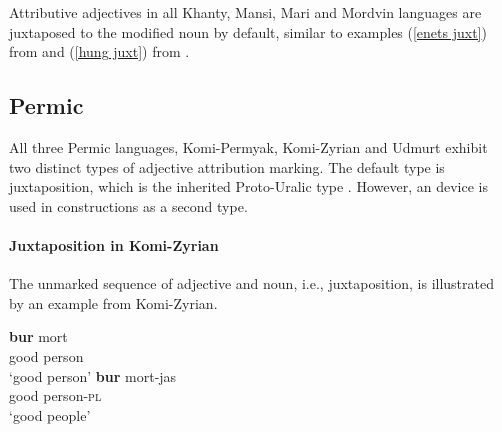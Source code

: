 Attributive adjectives in all Khanty, Mansi, Mari and Mordvin languages are juxtaposed to the modified noun by default, similar to examples (\ref{enets juxt}) from  and (\ref{hung juxt}) from .

\subsection{Permic}
All three Permic languages, Komi-Permyak, Komi-Zyrian and Udmurt exhibit two distinct types of adjective attribution marking. The default type is juxtaposition, which is the inherited Proto\hyp{}Uralic type \citep[80–81]{decsy1990}. However, an  device is used in  constructions as a second type.

\paragraph*{Juxtaposition in Komi-Zyrian}
The unmarked sequence of adjective and noun, i.e., juxtaposition, is illustrated by an example from Komi-Zyrian.
\begin{exe}
\begin{xlist} 
\ex
\gll 		\textbf{bur} 	mort\\
		good	person\\
\glt		‘good person’
\ex
\gll		\textbf{bur}	mort-jas\\
		good	person-\textsc{pl}\\
\glt		‘good people’
\end{xlist}
\end{exe}

